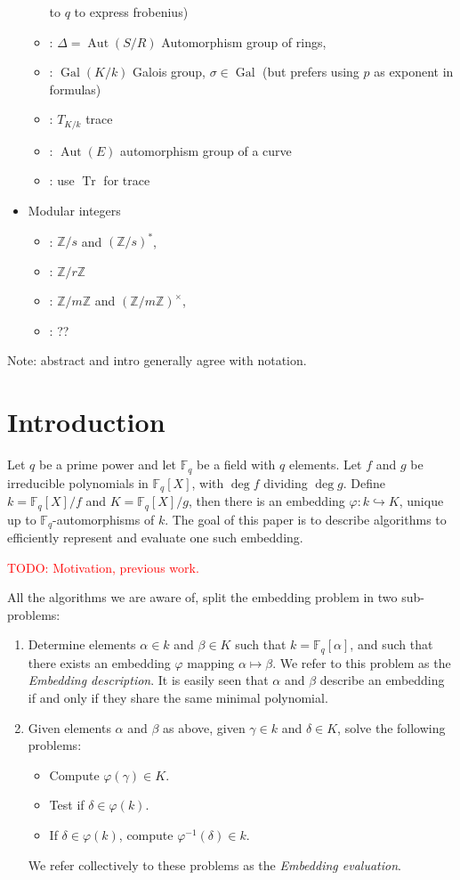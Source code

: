 \documentclass[12pt]{article}
\theoremstyle{plain}
\theoremstyle{definition}
\newcommand{\todo}[1]{\textcolor{red}{TODO: #1}}
\DeclareMathOperator{\trace}{Tr} %
\DeclareMathOperator{\gal}{Gal} %
\DeclareMathOperator{\Aut}{Aut}
\def\Z{\ensuremath{\mathbb{Z}}}
\def\F{\ensuremath{\mathbb{F}}}
\newcounter{algorithm}
\begin{document}
\begin{itemize}
\begin{itemize}
    to $q$ to express frobenius)
  \item \kummer: $\Delta=\Aut(S/R)$ Automorphism group of rings,
  \item \kummer: $\gal(K/k)$ Galois group, $\sigma\in\gal$ (but
    prefers using $p$ as exponent in formulas)
  \item \kummer: $T_{K/k}$ trace
  \item \rains: $\Aut(E)$ automorphism group of a curve
  \item \prop: use $\trace$ for trace
  \end{itemize}
\item Modular integers
  \begin{itemize}
  \item \poster: $\Z/s$ and $(\Z/s)^\ast$,
  \item \kummer: $\Z/r\Z$
  \item \rains: $\Z/m\Z$ and $(\Z/m\Z)^\times$,
  \item \prop: ??
  \end{itemize}
\end{itemize}

Note: abstract and intro generally agree with \poster{} notation.



\section{Introduction}

Let $q$ be a prime power and let $\F_q$ be a field with $q$
elements. Let $f$ and $g$ be irreducible polynomials in $\F_q[X]$,
with $\deg f$ dividing $\deg g$. Define $k=\F_q[X]/f$ and
$K=\F_q[X]/g$,
then there is an embedding $\varphi:k\hookrightarrow
K$, unique up to $\F_q$-automorphisms of $k$. The goal of this paper
is to describe algorithms to efficiently represent and evaluate one
such embedding.

\todo{Motivation, previous work.}

All the algorithms we are aware of, split the embedding problem in two
sub-problems:
\begin{enumerate}
\item Determine elements $\alpha\in k$ and $\beta\in K$ such that
  $k=\F_q[\alpha]$, and such that there exists an
  embedding $\varphi$ mapping $\alpha\mapsto\beta$. We refer to this
  problem as the \emph{Embedding description}.
  It is easily seen that $\alpha$ and $\beta$ describe an embedding
  if and only if they share the same minimal polynomial.
\item Given elements $\alpha$ and $\beta$ as above, given $\gamma\in
  k$ and $\delta\in K$, solve the following problems:
  \begin{itemize}
  \item Compute $\varphi(\gamma)\in K$.
  \item Test if $\delta\in\varphi(k)$.
  \item If $\delta\in\varphi(k)$, compute $\varphi^{-1}(\delta)\in k$.
  \end{itemize}
  We refer collectively to these problems as the \emph{Embedding
    evaluation}.
\end{enumerate}
\end{document}
